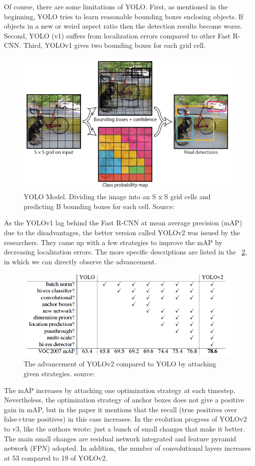 \documentclass[runningheads]{llncs}
\begin{document}
Of course, there are some limitations of YOLO. First, as mentioned in the beginning, YOLO tries to learn reasonable bounding boxes enclosing objects. If objects in a new or weird aspect ratio then the detection results become worse. Second, YOLO (v1) suffers from localization errors compared to other Fast R-CNN. Third, YOLOv1 gives two bounding boxes for each grid cell.
\begin{figure}
\includegraphics[width=\textwidth]{figs/YOLO_model.png}
\caption{YOLO Model. Dividing the image into an S x S grid cells and predicting B bounding boxes for each cell. Source: ~\cite{ref_yolov1}} \label{fig7}
\end{figure}
As the YOLOv1 lag behind the Fast R-CNN at mean average precision (mAP) due to the disadvantages, the better version called YOLOv2 was issued by the researchers. They came up with a few strategies to improve the mAP by decreasing localization errors. The more specific descriptions are listed in the ~\ref{fig8}, in which we can directly observe the advancement.
\begin{figure}
\includegraphics[width=\textwidth]{figs/YOLOv1_to_v2.png}
\caption{The advancement of YOLOv2 compared to YOLO by attaching given strategies. source: ~\cite{ref_yolov2}} \label{fig8}
\end{figure}
The mAP increases by attaching one optimization strategy at each timestep. Nevertheless, the optimization strategy of anchor boxes does not give a positive gain in mAP, but in the paper it mentions that the recall (true positives over false+true positives) in this case increases.
In the evolution progress of YOLOv2 to v3, like the authors wrote: just a bunch of small changes that make it better. The main small changes are residual network integrated and feature pyramid network (FPN) adopted. In addition, the number of convolutional layers increases at 53 compared to 19 of YOLOv2. 
\end{document}
